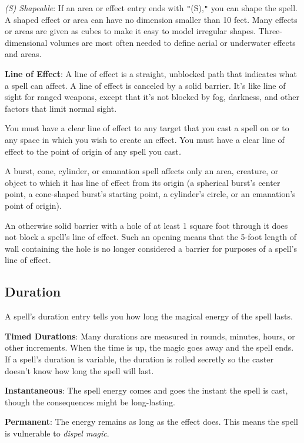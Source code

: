 \textit{(S) Shapeable}: If an area or effect entry ends with \texttt{{}"{}}(S),\texttt{{}"{}} you can shape the spell. A shaped effect or area can have no dimension smaller than 10 feet. Many effects or areas are given as cubes to make it easy to model irregular shapes. Three-dimensional volumes are most often needed to define aerial or underwater effects and areas.
				
\textbf{Line of Effect}: A line of effect is a straight, unblocked path that indicates what a spell can affect. A line of effect is canceled by a solid barrier. It's like line of sight for ranged weapons, except that it's not blocked by fog, darkness, and other factors that limit normal sight.
				
You must have a clear line of effect to any target that you cast a spell on or to any space in which you wish to create an effect. You must have a clear line of effect to the point of origin of any spell you cast\textit{.}
				
A burst, cone, cylinder, or emanation spell affects only an area, creature, or object to which it has line of effect from its origin (a spherical burst's center point, a cone-shaped burst's starting point, a cylinder's circle, or an emanation's point of origin).
				
An otherwise solid barrier with a hole of at least 1 square foot through it does not block a spell's line of effect. Such an opening means that the 5-foot length of wall containing the hole is no longer considered a barrier for purposes of a spell's line of effect.
				
\subsection{Duration}

				
A spell's duration entry tells you how long the magical energy of the spell lasts.
				
\textbf{Timed Durations}: Many durations are measured in rounds, minutes, hours, or other increments. When the time is up, the magic goes away and the spell ends. If a spell's duration is variable, the duration is rolled secretly so the caster doesn't know how long the spell will last. 
				
\textbf{Instantaneous}: The spell energy comes and goes the instant the spell is cast, though the consequences might be long-lasting.
				
\textbf{Permanent}: The energy remains as long as the effect does. This means the spell is vulnerable to \textit{dispel magic}. 
				
